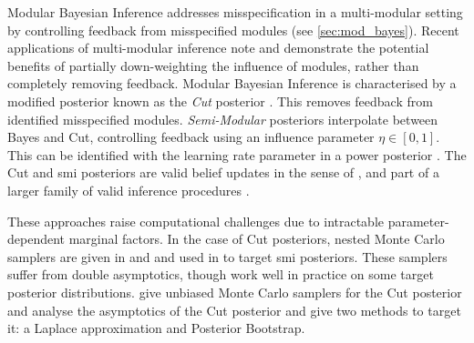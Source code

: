 Modular Bayesian Inference \citep{Liu2009modularization, Plummer2015cut,Jacob2017together, Carmona2020smi,Nicholls2022smi} addresses misspecification in a multi-modular setting by controlling feedback from misspecified modules (see \cref{sec:mod_bayes}).
Recent applications of multi-modular inference note \citep[eg.][]{Nicholson2021covid, Teh2021covid} and demonstrate \citep[eg.][]{Carmona2020smi,Yu2021variationalcut,Styring2022urban} the potential benefits of partially down-weighting the influence of modules, rather than completely removing feedback.
Modular Bayesian Inference is characterised by a modified posterior known as the \emph{Cut} posterior \citep{Plummer2015cut}. This removes feedback from identified misspecified modules. \emph{Semi-Modular} posteriors \citep{Carmona2020smi} interpolate between Bayes and Cut, controlling feedback using an influence parameter $\eta\in [0,1]$. This can be identified with the learning rate parameter in a power posterior \citep{Walker2001,Zhang2006,Grunwald2017a}.
The Cut and \acrshort*{smi} posteriors are valid belief updates in the sense of \citep{Bissiri2016}, and part of a larger family of valid inference procedures \citep{Nicholls2022smi}.

These approaches raise computational challenges due to intractable parameter-dependent marginal factors.
In the case of Cut posteriors, nested Monte Carlo samplers are given in \cite{Plummer2015cut} and
\cite{Liu2020sacut} and
used in \cite{Carmona2020smi} to target \acrshort*{smi} posteriors.
These samplers suffer from double asymptotics, though work well in practice on some target posterior distributions.
\cite{Jacob2020couplings} give unbiased Monte Carlo samplers for the Cut posterior and \cite{Pompe2021cut} analyse the asymptotics of the Cut posterior and give two methods to target it: a Laplace approximation and Posterior Bootstrap.

